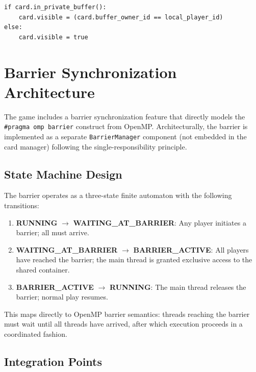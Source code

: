 \begin{lstlisting}[style={gdscript}, caption={Architectural mechanism: local buffer visibility gate (pseudocode)}]
if card.in_private_buffer():
    card.visible = (card.buffer_owner_id == local_player_id)
else:
    card.visible = true
\end{lstlisting}

\section{Barrier Synchronization Architecture}
\label{sec:barrier-architecture}

The game includes a barrier synchronization feature that directly models the \texttt{\#pragma omp barrier} construct from OpenMP. Architecturally, the barrier is implemented as a separate \texttt{BarrierManager} component (not embedded in the card manager) following the single-responsibility principle.

\subsection{State Machine Design}
\label{subsec:barrier-state-design}

The barrier operates as a three-state finite automaton with the following transitions:

\begin{enumerate}
    \item \textbf{RUNNING} $\to$ \textbf{WAITING\_AT\_BARRIER}: Any player initiates a barrier; all must arrive.
    \item \textbf{WAITING\_AT\_BARRIER} $\to$ \textbf{BARRIER\_ACTIVE}: All players have reached the barrier; the main thread is granted exclusive access to the shared container.
    \item \textbf{BARRIER\_ACTIVE} $\to$ \textbf{RUNNING}: The main thread releases the barrier; normal play resumes.
\end{enumerate}

This maps directly to OpenMP barrier semantics: threads reaching the barrier must wait until all threads have arrived, after which execution proceeds in a coordinated fashion.

\subsection{Integration Points}
\label{subsec:barrier-integration}

